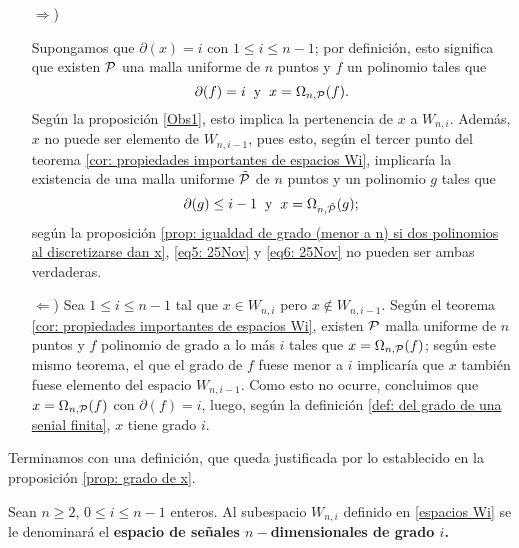 \begin{itemize}
\item [$\Rightarrow$)]

Supongamos que $\partial(x)=i$ con $1 \leq i \leq n-1$;
por definición, esto significa que existen
$\mathcal{P}$ una malla uniforme de $n$ puntos y $f$ un 
polinomio 
tales que 
\begin{equation}
\label{eq5: 25Nov}
\partial(f)=i \hspace{0.2cm} \text{y} \hspace{0.2cm}
x=\Omega_{n,\mathcal{P}}(f).
\end{equation}
Según la proposición 
\ref{Obs1},
esto implica la pertenencia de $x$ a $W_{n,i}$.
Además, $x$ no puede ser elemento de $W_{n,i-1}$,
pues esto,
según el tercer punto del teorema
\ref{cor: propiedades importantes de espacios Wi},
implicaría la existencia de una
malla uniforme $\tilde{\mathcal{P}}$ de $n$
puntos y un polinomio $g$ tales que
\begin{equation}
\label{eq6: 25Nov}
\partial(g)\leq i-1 \hspace{0.2cm} \text{y} \hspace{0.2cm}
x=\Omega_{n,\tilde{\mathcal{P}}}(g);
\end{equation}
según la proposición
\ref{prop: igualdad de grado (menor a n) si dos polinomios al discretizarse dan x}, \eqref{eq5: 25Nov}
y \eqref{eq6: 25Nov} no pueden ser ambas verdaderas.

\item[$\Leftarrow$)] Sea
$1 \leq i \leq n-1$ tal que $x \in W_{n,i}$
pero $x \not\in W_{n,i-1}$.
Según el teorema
\ref{cor: propiedades importantes de espacios Wi}, existen
$\mathcal{P}$ malla uniforme de $n$ puntos y
$f$ polinomio de grado a lo más $i$ tales que
$x= \Omega_{n, \mathcal{P}}(f)$; según este mismo
teorema, el que el grado de $f$ fuese menor a $i$
implicaría que $x$ también fuese elemento
del espacio $W_{n,i-1}$. Como esto no ocurre, concluimos
que $x= \Omega_{n, \mathcal{P}}(f)$
con $\partial(f)=i$, luego, según la definición
\ref{def: del grado de una senial finita}, 
$x$ tiene grado $i$. \QEDB
\end{itemize}
\vspace{0.2cm}

Terminamos con una definición, que queda justificada
por lo establecido en la proposición \ref{prop: grado de x}.

\begin{defi}
Sean $n \geq 2$, $0 \leq i \leq n-1$ enteros. 
Al subespacio $W_{n,i}$ definido en \eqref{espacios Wi}
se le denominará el \textbf{espacio de señales $n-$dimensionales
de grado $i$.}
\end{defi}



